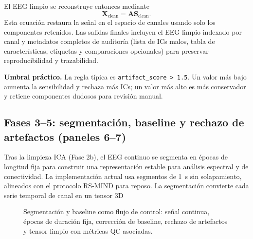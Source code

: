 El EEG limpio se reconstruye entonces mediante
\[
\mathbf{X}_{\text{clean}}=\mathbf{A}\mathbf{S}_{\text{clean}}.
\]
Esta ecuación restaura la señal en el espacio de canales usando solo los componentes retenidos. Las salidas finales incluyen el EEG limpio indexado por canal y metadatos completos de auditoría (lista de ICs malos, tabla de características, etiquetas y comparaciones opcionales) para preservar reproducibilidad y trazabilidad.

\begin{parametros}
\textbf{Umbral práctico.} La regla típica es \texttt{artifact\_score > 1.5}. Un valor más bajo aumenta la sensibilidad y rechaza más ICs; un valor más alto es más conservador y retiene componentes dudosos para revisión manual.
\end{parametros}


\subsection{Fases 3--5: segmentación, baseline y rechazo de artefactos (paneles 6--7)}

Tras la limpieza ICA (Fase 2b), el EEG continuo se segmenta en épocas de longitud fija para construir una representación estable para análisis espectral y de conectividad. La implementación actual usa segmentos de \SI{1}{s} sin solapamiento, alineados con el protocolo RS-MIND para reposo. La segmentación convierte cada serie temporal de canal en un tensor 3D

\begin{fullwidth}
\begin{figure}[H]
\centering
\resizebox{0.9\fulltextwidth}{!}{\NSEpochBaseline}
\caption{Segmentación y baseline como flujo de control: señal continua, épocas de duración fija, corrección de baseline, rechazo de artefactos y tensor limpio con métricas QC asociadas.}
\label{fig:generated-epochs-baseline-flow}
\end{figure}
\end{fullwidth}

